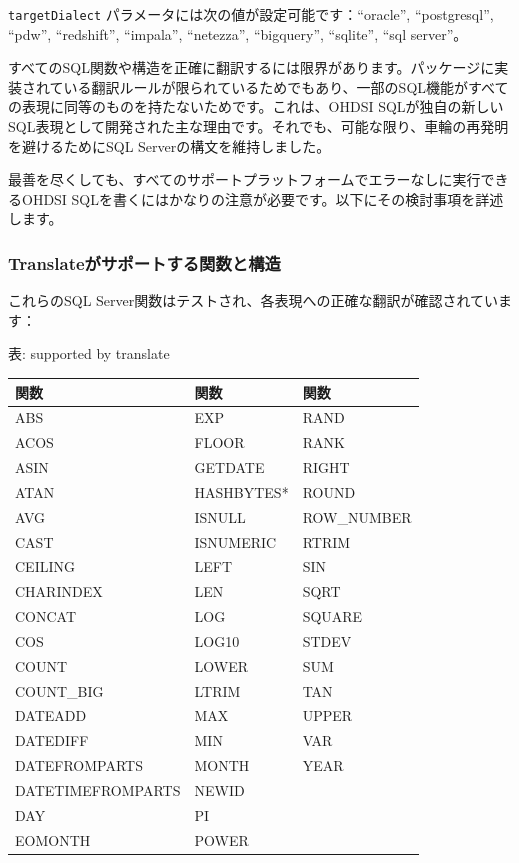 \documentclass[
  11pt]{book}
\makeatletter
\newenvironment{kframe}{%
\medskip{}
\setlength{\fboxsep}{.8em}
 \def\at@end@of@kframe{}%
 \ifinner\ifhmode%
  \def\at@end@of@kframe{\end{minipage}}%
  \begin{minipage}{\columnwidth}%
 \fi\fi%
 \def\FrameCommand##1{\hskip\@totalleftmargin \hskip-\fboxsep
 \colorbox{myShadeColor}{##1}\hskip-\fboxsep
     \hskip-\linewidth \hskip-\@totalleftmargin \hskip\columnwidth}%
 \MakeFramed {\advance\hsize-\width
   \@totalleftmargin\z@ \linewidth\hsize
   \@setminipage}}%
 {\par\unskip\endMakeFramed%
 \at@end@of@kframe}
\newenvironment{rmdblock}[1]
  {
  \begin{itemize}
  \renewcommand{\labelitemi}{
    \raisebox{-.7\height}[0pt][0pt]{
      {\setkeys{Gin}{width=3em,keepaspectratio}\texttt{[image: images/\#1]}}
    }
  }
  \setlength{\fboxsep}{1em}
  \begin{kframe}
  \item
  }
  {
  \end{kframe}
  \end{itemize}
  }
\newenvironment{rmdimportant}
  {\begin{rmdblock}{important}}
  {\end{rmdblock}}
\theoremstyle{definition}
\theoremstyle{definition}
\theoremstyle{definition}
\theoremstyle{definition}
\theoremstyle{remark}
\makeatother
\begin{document}
\texttt{targetDialect} パラメータには次の値が設定可能です：``oracle'', ``postgresql'', ``pdw'', ``redshift'', ``impala'', ``netezza'', ``bigquery'', ``sqlite'', ``sql server''。 

\begin{rmdimportant}
すべてのSQL関数や構造を正確に翻訳するには限界があります。パッケージに実装されている翻訳ルールが限られているためでもあり、一部のSQL機能がすべての表現に同等のものを持たないためです。これは、OHDSI SQLが独自の新しいSQL表現として開発された主な理由です。それでも、可能な限り、車輪の再発明を避けるためにSQL Serverの構文を維持しました。
\end{rmdimportant}

最善を尽くしても、すべてのサポートプラットフォームでエラーなしに実行できるOHDSI SQLを書くにはかなりの注意が必要です。以下にその検討事項を詳述します。

\subsubsection*{Translateがサポートする関数と構造}\label{translateux304cux30b5ux30ddux30fcux30c8ux3059ux308bux95a2ux6570ux3068ux69cbux9020}

これらのSQL Server関数はテストされ、各表現への正確な翻訳が確認されています：

表: \label{tab:sqlFunctions} supported by translate

\begin{longtable}[]{@{}lll@{}}
\toprule\noalign{}
関数 & 関数 & 関数 \\
\midrule\noalign{}
\endhead
\bottomrule\noalign{}
\endlastfoot
ABS & EXP & RAND \\
ACOS & FLOOR & RANK \\
ASIN & GETDATE & RIGHT \\
ATAN & HASHBYTES* & ROUND \\
AVG & ISNULL & ROW\_NUMBER \\
CAST & ISNUMERIC & RTRIM \\
CEILING & LEFT & SIN \\
CHARINDEX & LEN & SQRT \\
CONCAT & LOG & SQUARE \\
COS & LOG10 & STDEV \\
COUNT & LOWER & SUM \\
COUNT\_BIG & LTRIM & TAN \\
DATEADD & MAX & UPPER \\
DATEDIFF & MIN & VAR \\
DATEFROMPARTS & MONTH & YEAR \\
DATETIMEFROMPARTS & NEWID & \\
DAY & PI & \\
EOMONTH & POWER & \\
\end{longtable}
\end{document}

